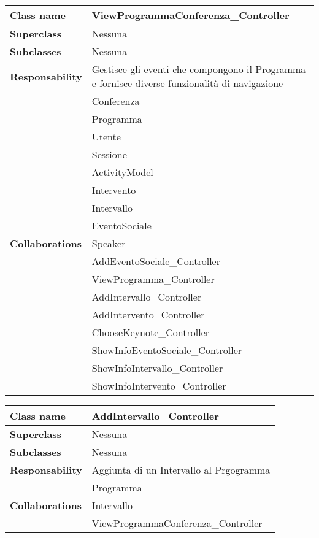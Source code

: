 \begin{table}[h!]
	\begin{tabular}{|l|l|}
		\hline 
		\textbf{Class name} & ViewProgrammaConferenza\_Controller
		\\ \hline
		\textbf{Superclass} & Nessuna
		\\ \hline
		\multirow{1}{*}{\textbf{Subclasses}} & Nessuna
		\\ \hline
		\textbf{Responsability} & Gestisce gli eventi che compongono il Programma e fornisce diverse funzionalità di navigazione
		\\ \hline
		\multirow{17}{*}{\textbf{Collaborations}} & Conferenza \\
		& Programma\\
		& Utente\\
		& Sessione\\
		& ActivityModel\\
		& Intervento \\
		& Intervallo \\
		& EventoSociale\\
		& Speaker\\
		& AddEventoSociale\_Controller\\
		& ViewProgramma\_Controller\\
		& AddIntervallo\_Controller\\
		& AddIntervento\_Controller\\
		& ChooseKeynote\_Controller\\
		& ShowInfoEventoSociale\_Controller\\
		& ShowInfoIntervallo\_Controller\\
		& ShowInfoIntervento\_Controller
		\\ \hline
	\end{tabular}
\end{table}

\newpage

\begin{table}[h!]
	\begin{tabular}{|l|l|}
		\hline 
		\textbf{Class name} & AddIntervallo\_Controller
		\\ \hline
		\textbf{Superclass} & Nessuna
		\\ \hline
		\multirow{1}{*}{\textbf{Subclasses}} & Nessuna
		\\ \hline
		\textbf{Responsability} & Aggiunta di un Intervallo al Prgogramma
		\\ \hline
		\multirow{3}{*}{\textbf{Collaborations}} & Programma \\
		& Intervallo\\
		& ViewProgrammaConferenza\_Controller
		\\ \hline
	\end{tabular}
\end{table}

